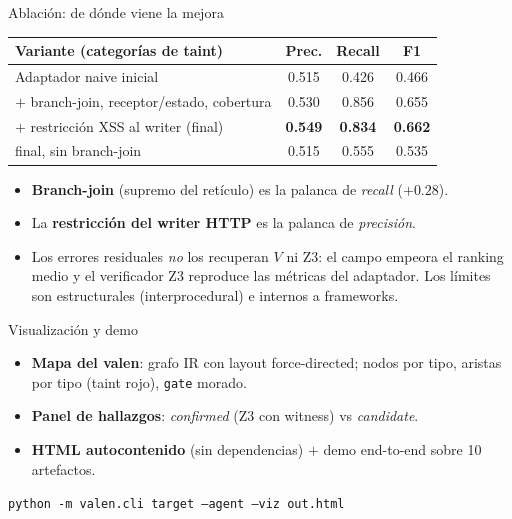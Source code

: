 \documentclass[aspectratio=169,11pt]{beamer}
\begin{document}
\begin{frame}{Ablación: de dónde viene la mejora}
  \begin{center}
  \small
  \begin{tabular}{lccc}
  \toprule
  Variante (categorías de taint) & Prec. & Recall & F1 \\
  \midrule
  Adaptador naive inicial & 0.515 & 0.426 & 0.466 \\
  $+$ branch-join, receptor/estado, cobertura & 0.530 & 0.856 & 0.655 \\
  $+$ restricción XSS al writer (final) & \textbf{0.549} & \textbf{0.834} & \textbf{0.662} \\
  \midrule
  final, sin branch-join & 0.515 & 0.555 & 0.535 \\
  \bottomrule
  \end{tabular}
  \end{center}
  \begin{itemize}
    \item \textbf{Branch-join} (supremo del retículo) es la palanca de \emph{recall} ($+0.28$).
    \item La \textbf{restricción del writer HTTP} es la palanca de \emph{precisión}.
    \item Los errores residuales \emph{no} los recuperan $V$ ni Z3: el campo empeora
          el ranking medio y el verificador Z3 reproduce las métricas del adaptador.
          Los límites son estructurales (interprocedural) e internos a frameworks.
  \end{itemize}
\end{frame}

\begin{frame}{Visualización y demo}
  \begin{itemize}
    \item \textbf{Mapa del valen}: grafo IR con layout force-directed; nodos por tipo,
          aristas por tipo (taint rojo), \texttt{gate} morado.
    \item \textbf{Panel de hallazgos}: \emph{confirmed} (Z3 con witness) vs \emph{candidate}.
    \item \textbf{HTML autocontenido} (sin dependencias) $+$ demo end-to-end sobre 10 artefactos.
  \end{itemize}
  \vspace{2mm}
  \begin{center}
  \texttt{python -m valen.cli target --agent --viz out.html}
  \end{center}
\end{frame}
\end{document}
